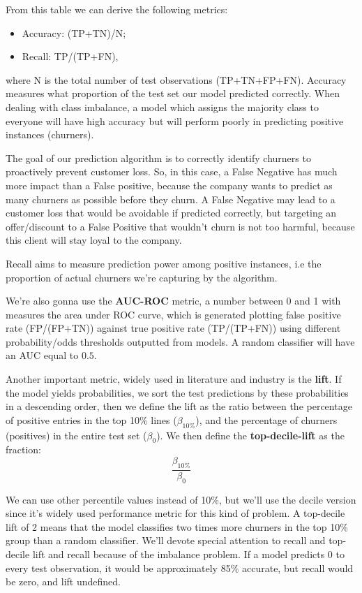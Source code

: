 \documentclass[12pt,letterpaper]{article}
\begin{document}
From this table we can derive the following metrics:
\begin{itemize}
	\item Accuracy: (TP+TN)/N;
	\item Recall: TP/(TP+FN),
\end{itemize}
where N is the total number of test observations (TP+TN+FP+FN). Accuracy measures what proportion of the test set our model predicted correctly. When dealing with class imbalance, a model which assigns the majority class to everyone will have high accuracy but will perform poorly in predicting positive instances (churners).

The goal of our prediction algorithm is to correctly identify churners to proactively prevent customer loss. So, in this case, a False Negative has much more impact than a False positive, because the company wants to predict as many churners as possible before they churn. A False Negative may lead to a customer loss that would be avoidable if predicted correctly, but targeting an offer/discount to a False Positive that wouldn't churn is not too harmful, because this client will stay loyal to the company.

Recall aims to measure prediction power among positive instances, i.e the proportion of actual churners we're capturing by the algorithm.

We're also gonna use the \textbf{AUC-ROC} metric, a number between 0 and 1 with measures the area under ROC curve, which is generated plotting false positive rate (FP/(FP+TN)) against true positive rate (TP/(TP+FN)) using different probability/odds thresholds outputted from models. A random classifier will have an AUC equal to $0.5$.

Another important metric, widely used in literature and industry is the \textbf{lift}\cite{class_imbalance}. If the model yields probabilities, we sort the test predictions by these probabilities in a descending order, then we define the lift as the ratio between the percentage of positive entries in the top 10\% lines ($\beta_ {10\%}$), and the percentage of churners (positives) in the entire test set ($\beta_0$). We then define the \textbf{top-decile-lift} as the fraction:
$$\dfrac{\beta_{10\%}}{\beta_0}$$

We can use other percentile values instead of 10\%, but we'll use the decile version since it's widely used performance metric for this kind of problem. A top-decile lift of 2 means that the model classifies two times more churners in the top 10\% group than a random classifier. We’ll devote special attention to recall and top-decile lift and recall because of the imbalance problem. If a model predicts 0 to every test observation, it would be approximately 85\% accurate, but recall would be zero, and lift undefined.
\end{document}
